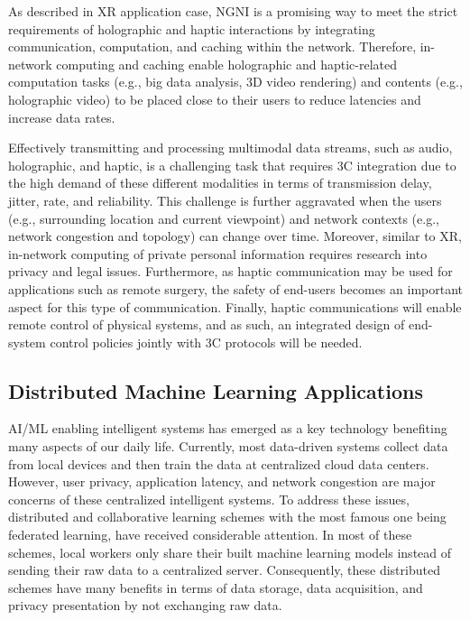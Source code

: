 As described in XR application case, NGNI is a promising way to meet the strict requirements of holographic and haptic interactions by integrating communication, computation, and caching within the network. Therefore, in-network computing and caching enable holographic and haptic-related computation tasks (e.g., big data analysis, 3D video rendering) and contents (e.g., holographic video) to be placed close to their users to reduce latencies and increase data rates.

Effectively transmitting and processing multimodal data streams, such as audio, holographic, and haptic, is a challenging task that requires 3C integration due to the high demand of these different modalities in terms of transmission delay, jitter, rate, and reliability. This challenge is further aggravated when the users (e.g., surrounding location and current viewpoint) and network contexts (e.g., network congestion and topology) can change over time. Moreover, similar to XR, in-network computing of private personal information requires research into privacy and legal issues.  Furthermore, as haptic communication may be used for applications such as remote surgery, the safety of end-users becomes an important aspect for this type of communication.  Finally, haptic communications will enable remote control of physical systems, and as such, an integrated design of end-system control policies jointly with 3C protocols will be needed.
 
 \subsection{Distributed Machine Learning Applications}
 
 \noindent AI/ML enabling intelligent systems has emerged as a key technology benefiting many aspects of our daily life. Currently, most data-driven systems collect data from local devices and then train the data at centralized cloud data centers. However, user privacy, application latency, and network congestion are major concerns of these centralized intelligent systems. To address these issues, distributed and collaborative learning schemes with the most famous one being federated learning, have received considerable attention. In most of these schemes, local workers only share their built machine learning models instead of sending their raw data to a centralized server. Consequently, these distributed schemes have many benefits in terms of data storage, data acquisition, and privacy presentation by not exchanging raw data. 

